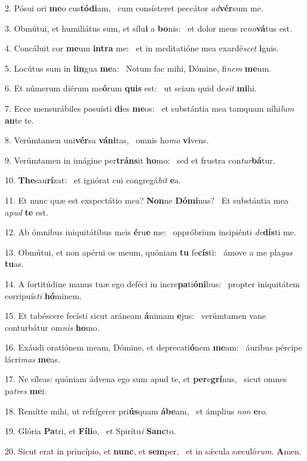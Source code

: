 2. Pósui ori \textbf{me}o cus\textbf{tó}\textbf{di}am, \ast\  cum consísteret peccátor \textit{ad}\textbf{vér}sum me.\

3. Obmútui, et humiliátus sum, et sílu\textbf{i} a \textbf{bo}nis: \ast\  et dolor meus re\textit{no}\textbf{vá}tus est.\

4. Concáluit cor \textbf{me}um \textbf{in}\textbf{tra} me: \ast\  et in meditatióne mea exardé\textit{scet} \textbf{i}gnis.\

5. Locútus sum in \textbf{lin}gua \textbf{me}a: \ast\  Notum fac mihi, Dómine, fi\textit{nem} \textbf{me}um.\

6. Et númerum diérum me\textbf{ó}rum \textbf{quis} est: \ast\  ut sciam quid de\textit{sit} \textbf{mi}hi.\

7. Ecce mensurábiles posuísti \textbf{di}es \textbf{me}os: \ast\  et substántia mea tamquam níhi\textit{lum} \textbf{an}te te.\

8. Verúmtamen uni\textbf{vér}sa \textbf{vá}\textbf{ni}tas, \ast\  omnis ho\textit{mo} \textbf{vi}vens.\

9. Verúmtamen in imágine per\textbf{tráns}it \textbf{ho}mo: \ast\  sed et frustra con\textit{tur}\textbf{bá}tur.\

10. \textbf{The}sau\textbf{rí}zat: \ast\  et ignórat cui congregá\textit{bit} \textbf{e}a.\

11. Et nunc quæ est exspectátio mea? \textbf{Non}ne \textbf{Dó}\textbf{mi}nus? \ast\  Et substántia mea a\textit{pud} \textbf{te} est.\

12. Ab ómnibus iniquitátibus meis \textbf{é}ru\textbf{e} me: \ast\  oppróbrium insipiénti \textit{de}\textbf{dís}ti me.\

13. Obmútui, et non apérui os meum, quóniam \textbf{tu} fe\textbf{cís}ti: \ast\  ámove a me pla\textit{gas} \textbf{tu}as.\

14. A fortitúdine manus tuæ ego deféci in incre\textbf{pa}ti\textbf{ó}\textbf{ni}bus: \ast\  propter iniquitátem corripuís\textit{ti} \textbf{hó}minem.\

15. Et tabéscere fecísti sicut aráneam \textbf{á}nimam \textbf{e}jus: \ast\  verúmtamen vane conturbátur om\textit{nis} \textbf{ho}mo.\

16. Exáudi oratiónem meam, Dómine, et deprecati\textbf{ó}nem \textbf{me}am: \ast\  áuribus pércipe lácri\textit{mas} \textbf{me}as.\

17. Ne síleas: quóniam ádvena ego sum apud te, et \textbf{per}e\textbf{grí}nus, \ast\  sicut omnes pa\textit{tres} \textbf{me}i.\

18. Remítte mihi, ut refrígerer pri\textbf{ús}quam \textbf{á}\textbf{be}am, \ast\  et ámplius \textit{non} \textbf{e}ro.\

19. Glória \textbf{Pa}tri, et \textbf{Fí}\textbf{li}o, \ast\  et Spirítu\textit{i} \textbf{Sanc}to.\

20. Sicut erat in princípio, et \textbf{nunc}, et \textbf{sem}per, \ast\  et in sǽcula sæculó\textit{rum}. \textbf{A}men.\

